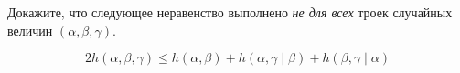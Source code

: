Докажите, что следующее неравенство выполнено \textit{не для всех} троек случайных величин $(\alpha,
\beta, \gamma)$.

$$
    2 h(\alpha, \beta, \gamma) \le h(\alpha, \beta) + h(\alpha, \gamma \mid \beta) +
    h(\beta, \gamma \mid \alpha)
$$

